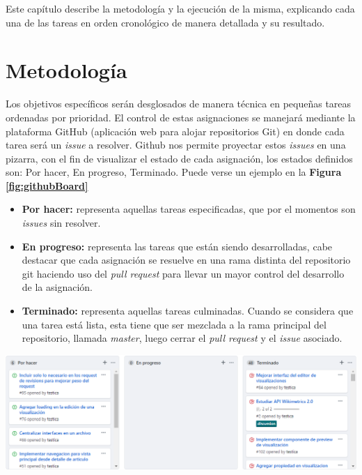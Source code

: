 Este capítulo describe la metodología y la ejecución de la misma, explicando cada una de las tareas en orden cronológico de manera detallada y su resultado.

\section{Metodología}
Los objetivos específicos serán desglosados de manera técnica en pequeñas tareas ordenadas por prioridad. El control de estas asignaciones se manejará mediante la plataforma GitHub (aplicación web para alojar repositorios Git) en donde cada tarea será un \textit{issue} a resolver. Github nos permite proyectar estos \textit{issues} en una pizarra, con el fin de visualizar el estado de cada asignación, los estados definidos son: Por hacer, En progreso, Terminado. Puede verse un ejemplo en la \textbf{Figura \ref{fig:githubBoard}}

\begin{itemize}
\item\textbf{Por hacer:} representa aquellas tareas especificadas, que por el momentos son \textit{issues} sin resolver.
\item\textbf{En progreso:} representa las tareas que están siendo desarrolladas, cabe destacar que cada asignación se resuelve en una rama distinta del repositorio git haciendo uso del \textit{pull request} para llevar un mayor control del desarrollo de la asignación.
\item\textbf{Terminado:} representa aquellas tareas culminadas. Cuando se considera que una tarea está lista, esta tiene que ser mezclada a la rama principal del repositorio, llamada \textit{master}, luego cerrar el \textit{pull request} y el \textit{issue} asociado.
\end{itemize}

\begin{center}
    \bigbreak
    \includegraphics[scale=0.4]{images/marco_aplicativo/github_board.png}
    \label{fig:githubBoard}
    \bigbreak
\end{center}

